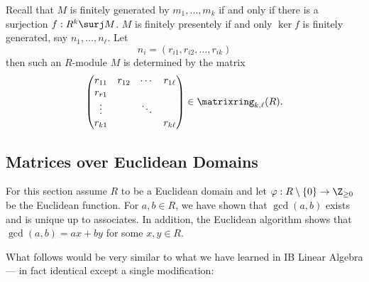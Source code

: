 \documentclass[a4paper]{article}
\theoremstyle{definition}
\begin{document}
Recall that \(M\) is finitely generated by \(m_1, \dots, m_k\) if and only if there is a surjection \(f: R^k \surj M\). \(M\) is finitely presentely if and only \(\ker f\) is finitely generated, say \(n_1, \dots, n_\ell\). Let
\[
  n_i = (r_{i1}, r_{i2}, \dots, r_{ik})
\]
then such an \(R\)-module \(M\) is determined by the matrix
\[
  \begin{pmatrix}
    r_{11} & r_{12} & \cdots & r_{1\ell} \\
    r_{r1} & & & \\
    \vdots & & \ddots & \\
    r_{k1} & & & r_{k\ell}
  \end{pmatrix}
  \in \matrixring_{k, \ell}(R).
\]

\subsection{Matrices over Euclidean Domains}

For this section assume \(R\) to be a Euclidean domain and let \(\varphi: R \setminus \{0\} \to \Z_{\geq 0}\) be the Euclidean function. For \(a, b \in R\), we have shown that \(\gcd(a, b)\) exists and is unique up to associates. In addition, the Euclidean algorithm shows that \(\gcd(a, b) = ax + by\) for some \(x, y \in R\).

What follows would be very similar to what we have learned in IB Linear Algebra --- in fact identical except a single modification:
\end{document}
